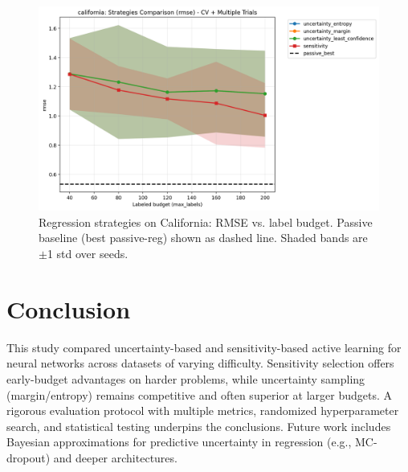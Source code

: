 \documentclass[conference]{IEEEtran}
\begin{document}
\begin{figure}[t]
\centering
\includegraphics[width=0.95\columnwidth]{figures/reg_california_comparison_rmse.png}
\caption{Regression strategies on California: RMSE vs. label budget. Passive baseline (best passive-reg) shown as dashed line. Shaded bands are $\pm$1 std over seeds.}
\label{fig:reg-compare}
\end{figure}

\section{Conclusion}
This study compared uncertainty-based and sensitivity-based active learning for neural networks across datasets of varying difficulty. Sensitivity selection offers early-budget advantages on harder problems, while uncertainty sampling (margin/entropy) remains competitive and often superior at larger budgets. A rigorous evaluation protocol with multiple metrics, randomized hyperparameter search, and statistical testing underpins the conclusions. Future work includes Bayesian approximations for predictive uncertainty in regression (e.g., MC-dropout) and deeper architectures.



\end{document}
